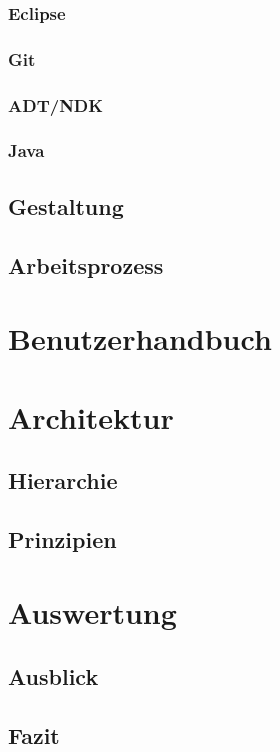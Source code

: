 \subsubsection{Eclipse}  %
\subsubsection{Git}  %
\subsubsection{ADT/NDK}  %
\subsubsection{Java}  %

\subsection{Gestaltung}  %
\subsection{Arbeitsprozess}  %

\section{Benutzerhandbuch}  %

\section{Architektur}  %
\subsection{Hierarchie}  %
\subsection{Prinzipien}  %

\section{Auswertung}  %
\subsection{Ausblick}  %
\subsection{Fazit}  %


\appendix
\printbibliography[heading=bibintoc,title={Quellenverzeichnis}]
\listoffigures


